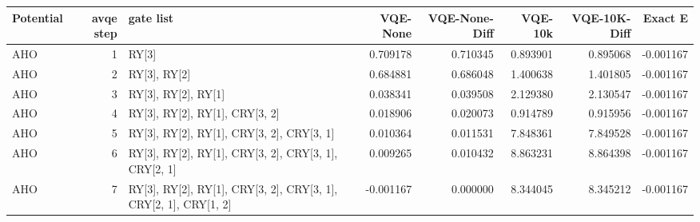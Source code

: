 \begin{tabular}{lrlrrrrr}
\toprule
Potential & avqe step & gate list & VQE-None & VQE-None-Diff & VQE-10k & VQE-10K-Diff & Exact E \\
\midrule
AHO & 1 & RY[3] & 0.709178 & 0.710345 & 0.893901 & 0.895068 & -0.001167 \\
AHO & 2 & RY[3], RY[2] & 0.684881 & 0.686048 & 1.400638 & 1.401805 & -0.001167 \\
AHO & 3 & RY[3], RY[2], RY[1] & 0.038341 & 0.039508 & 2.129380 & 2.130547 & -0.001167 \\
AHO & 4 & RY[3], RY[2], RY[1], CRY[3, 2] & 0.018906 & 0.020073 & 0.914789 & 0.915956 & -0.001167 \\
AHO & 5 & RY[3], RY[2], RY[1], CRY[3, 2], CRY[3, 1] & 0.010364 & 0.011531 & 7.848361 & 7.849528 & -0.001167 \\
AHO & 6 & RY[3], RY[2], RY[1], CRY[3, 2], CRY[3, 1], CRY[2, 1] & 0.009265 & 0.010432 & 8.863231 & 8.864398 & -0.001167 \\
AHO & 7 & RY[3], RY[2], RY[1], CRY[3, 2], CRY[3, 1], CRY[2, 1], CRY[1, 2] & -0.001167 & 0.000000 & 8.344045 & 8.345212 & -0.001167 \\
\bottomrule
\end{tabular}
